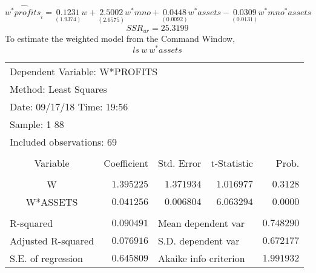 \documentclass[12pt]{report}
\begin{document}
$$\widehat{w^*profits}_i = \underset{(1.9374)}{0.1231}w + \underset{(2.6575)}{2.5002}w^*mno + \underset{(0.0092)}{0.0448}w^*assets - \underset{(0.0131)}{0.0309}w^*mno^*assets$$ $$SSR_{ur} = 25.3199$$
\noindent To estimate the weighted model from the Command Window,
$$ls\ w\ w^*assets$$
\begin{figure}[H]
	\centering
\end{figure}
\vspace{-\baselineskip} 


\begin{table}[H]
	\centering
	\begin{tabular}{lrrrr}
		\multicolumn{4}{l}{Dependent Variable: W*PROFITS}&\multicolumn{1}{c}{}\\
		\multicolumn{3}{l}{Method: Least Squares}&\multicolumn{1}{c}{}&\multicolumn{1}{c}{}\\
		\multicolumn{3}{l}{Date: 09/17/18   Time: 19:56}&\multicolumn{1}{c}{}&\multicolumn{1}{c}{}\\
		\multicolumn{2}{l}{Sample: 1 88}&\multicolumn{1}{c}{}&\multicolumn{1}{c}{}&\multicolumn{1}{c}{}\\
		\multicolumn{3}{l}{Included observations: 69}&\multicolumn{1}{c}{}&\multicolumn{1}{c}{}\\
		[4.5pt] \hline \\ [-4.5pt]
		\multicolumn{1}{c}{Variable}&\multicolumn{1}{r}{Coefficient}&\multicolumn{1}{r}{Std. Error}&\multicolumn{1}{r}{t-Statistic}&\multicolumn{1}{r}{Prob.}\\
		[4.5pt] \hline \\ [-4.5pt]
		\multicolumn{1}{c}{W}&\multicolumn{1}{r}{$1.395225$}&\multicolumn{1}{r}{$1.371934$}&\multicolumn{1}{r}{$1.016977$}&\multicolumn{1}{r}{$0.3128$}\\
		\multicolumn{1}{c}{W*ASSETS}&\multicolumn{1}{r}{$0.041256$}&\multicolumn{1}{r}{$0.006804$}&\multicolumn{1}{r}{$6.063294$}&\multicolumn{1}{r}{$0.0000$}\\
		[4.5pt] \hline \\ [-4.5pt]
		\multicolumn{1}{l}{R-squared}&\multicolumn{1}{r}{$0.090491$}&\multicolumn{2}{l}{Mean dependent var}&\multicolumn{1}{r}{$0.748290$}\\
		\multicolumn{1}{l}{Adjusted R-squared}&\multicolumn{1}{r}{$0.076916$}&\multicolumn{2}{l}{S.D. dependent var}&\multicolumn{1}{r}{$0.672177$}\\
		\multicolumn{1}{l}{S.E. of regression}&\multicolumn{1}{r}{$0.645809$}&\multicolumn{2}{l}{Akaike info criterion}&\multicolumn{1}{r}{$1.991932$}\\

\end{tabular}
\end{table}
\end{document}
